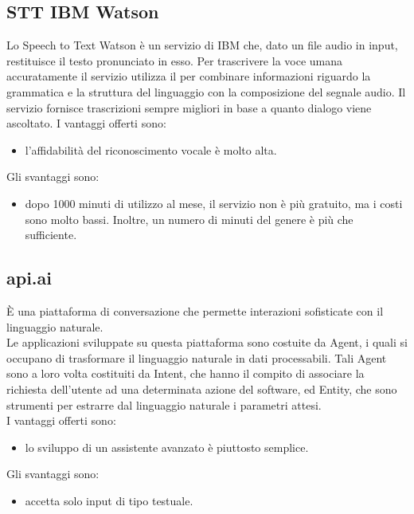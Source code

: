 \subsection{STT IBM Watson}
Lo Speech to Text Watson è un servizio di IBM che, dato un file audio in input, restituisce il testo pronunciato in esso. Per trascrivere la voce umana accuratamente il servizio utilizza il  per combinare informazioni riguardo la grammatica e la struttura del linguaggio con la composizione del segnale audio. Il servizio fornisce trascrizioni sempre migliori in base a quanto dialogo viene ascoltato.
I vantaggi offerti sono:
\begin{itemize}
	\item l'affidabilità del riconoscimento vocale è molto alta.
\end{itemize}
Gli svantaggi sono:
\begin{itemize}
	\item dopo 1000 minuti di utilizzo  al mese, il servizio non è più gratuito, ma i costi sono molto bassi. Inoltre, un numero di minuti del genere è più che sufficiente.
\end{itemize}
\subsection{api.ai}
È una piattaforma di conversazione che permette interazioni sofisticate con il linguaggio naturale.\\
Le applicazioni sviluppate su questa piattaforma sono costuite da Agent, i quali si occupano di trasformare il linguaggio naturale in dati processabili. Tali Agent sono a loro volta costituiti da Intent, che hanno il compito di associare la richiesta dell'utente ad una determinata azione del software, ed Entity, che sono strumenti per estrarre dal linguaggio naturale i parametri attesi.\\
I vantaggi offerti sono:
\begin{itemize}
	\item lo sviluppo di un assistente avanzato è piuttosto semplice.
\end{itemize}
Gli svantaggi sono:
\begin{itemize}
	\item accetta solo input di tipo testuale.
\end{itemize}
